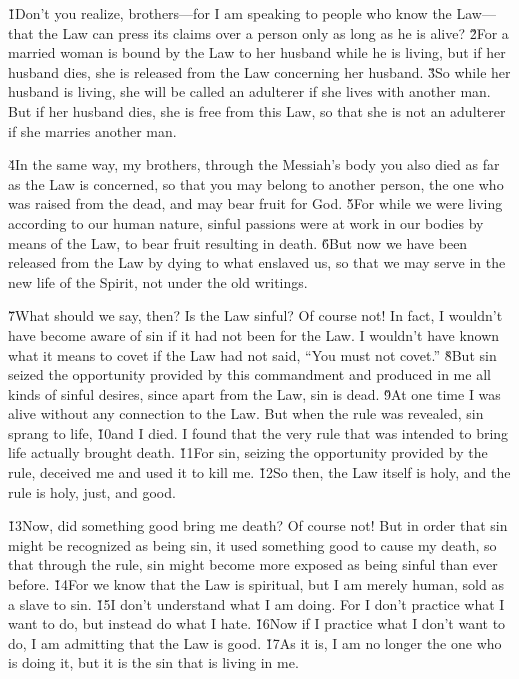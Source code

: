 \v{1}Don't you realize, brothers---for I am speaking to people who know the Law---that the Law can press its claims over a person only as long as he is alive? \v{2}For a married woman is bound by the Law to her husband while he is living, but if her husband dies, she is released from the Law concerning her husband. \v{3}So while her husband is living, she will be called an adulterer if she lives with another man. But if her husband dies, she is free from this Law, so that she is not an adulterer if she marries another man.

\v{4}In the same way, my brothers, through the Messiah's body you also died as far as the Law is concerned, so that you may belong to another person, the one who was raised from the dead, and may bear fruit for God. \v{5}For while we were living according to our human nature, sinful passions were at work in our bodies by means of the Law, to bear fruit resulting in death. \v{6}But now we have been released from the Law by dying to what enslaved us, so that we may serve in the new life of the Spirit, not under the old writings.

\v{7}What should we say, then? Is the Law sinful? Of course not! In fact, I wouldn't have become aware of sin if it had not been for the Law. I wouldn't have known what it means to covet if the Law had not said, ``You must not covet.'' \v{8}But sin seized the opportunity provided by this commandment and produced in me all kinds of sinful desires, since apart from the Law, sin is dead. \v{9}At one time I was alive without any connection to the Law. But when the rule was revealed, sin sprang to life, \v{10}and I died. I found that the very rule that was intended to bring life actually brought death. \v{11}For sin, seizing the opportunity provided by the rule, deceived me and used it to kill me. \v{12}So then, the Law itself is holy, and the rule is holy, just, and good.

\v{13}Now, did something good bring me death? Of course not! But in order that sin might be recognized as being sin, it used something good to cause my death, so that through the rule, sin might become more exposed as being sinful than ever before. \v{14}For we know that the Law is spiritual, but I am merely human, sold as a slave to sin. \v{15}I don't understand what I am doing. For I don't practice what I want to do, but instead do what I hate. \v{16}Now if I practice what I don't want to do, I am admitting that the Law is good. \v{17}As it is, I am no longer the one who is doing it, but it is the sin that is living in me.

